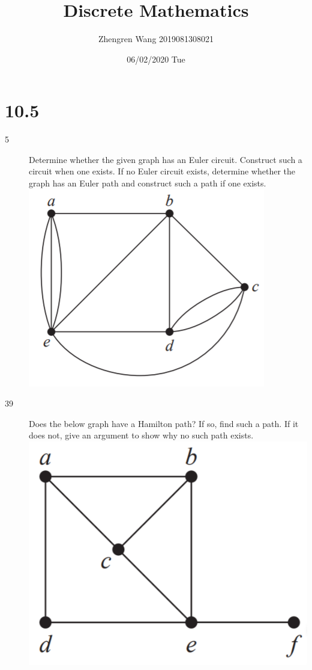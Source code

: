 \documentclass[UTF8]{article}
\title{Discrete Mathematics}
\author{Zhengren Wang 2019081308021}
\date{06/02/2020 Tue}
\begin{document}
\maketitle 

\part{10.5}
\begin{description}
    \item[5]Determine whether the given graph has an Euler circuit. Construct such a circuit when one exists. If no Euler circuit exists, determine whether the graph has an Euler path and construct such a path if one exists.  \\
        \includegraphics[scale=0.3]{../imgs/10_5_5.png}


    \item[39]Does the below graph have a Hamilton path? If so, find such a path. If it does not, give an argument to show why no such path exists.   \\
        \includegraphics[scale=0.3]{../imgs/10_5_39.png}

\end{description}
\end{document}
